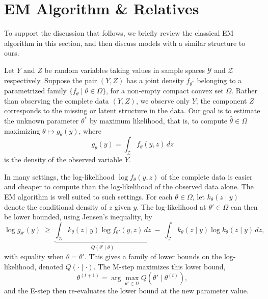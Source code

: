 \section{EM Algorithm \& Relatives}
\label{sec: em-algorithm-relatives}

To support the discussion that follows, we briefly review the classical EM algorithm in this section, and then discuss models with a similar structure to ours.

Let $Y$ and $Z$ be random variables taking values in sample spaces $\mathcal{Y}$ and $\mathcal{Z}$ respectively. Suppose the pair $(Y,Z)$ has a joint density $f_{\theta^\ast}$ belonging to a parametrized family $\{f_\theta\mid\theta\in\Omega\}$, for a non-empty compact convex set $\Omega$. Rather than observing the complete data $(Y,Z)$, we observe only $Y$; the component $Z$ corresponds to the missing or latent structure in the data. Our goal is to estimate the unknown parameter $\theta^\ast$ by maximum likelihood, that is, to compute $\hat\theta\in\Omega$ maximizing $\theta\mapsto g_\theta(y)$, where
\begin{equation}
g_\theta(y)=\int_{\mathcal{Z}}f_\theta(y,z)\,dz
\label{eq:classical-em-integral}
\end{equation}
is the density of the observed variable $Y$.

In many settings, the log-likelihood $\log f_\theta(y,z)$ of the complete data is easier and cheaper to compute than the log-likelihood of the observed data alone. The EM algorithm is well suited to such settings. For each $\theta\in\Omega$, let $k_\theta(z\mid y)$ denote the conditional density of $z$ given $y$. The log-likelihood at $\theta'\in\Omega$ can then be lower bounded, using Jensen's inequality, by
\begin{equation}
\log g_{\theta'}(y)\;\ge\;\underbrace{\int_{\mathcal{Z}}k_\theta(z\mid y)\log f_{\theta'}(y,z)\,dz}_{Q(\theta'\mid\theta)}\;-\;\int_{\mathcal{Z}}k_\theta(z\mid y)\log k_\theta(z\mid y)\,dz,
\label{eq:classical-em-jensen}
\end{equation}
with equality when $\theta=\theta'$. This gives a family of lower bounds on the log-likelihood, denoted $Q(\cdot\mid\cdot)$. The M-step maximizes this lower bound,
\begin{equation}
\theta^{(t+1)}=\arg\max_{\theta'\in\Omega}Q(\theta'\mid\theta^{(t)}),
\label{eq:em-m-step}
\end{equation}
and the E-step then re-evaluates the lower bound at the new parameter value.